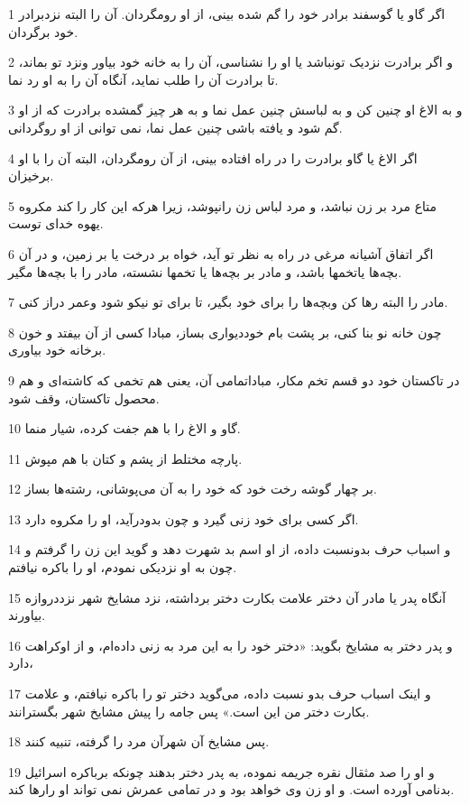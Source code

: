 \par 1 اگر گاو یا گوسفند برادر خود را گم شده بینی، از او رومگردان. آن را البته نزدبرادر خود برگردان.
\par 2 و اگر برادرت نزدیک تونباشد یا او را نشناسی، آن را به خانه خود بیاور ونزد تو بماند، تا برادرت آن را طلب نماید، آنگاه آن را به او رد نما.
\par 3 و به الاغ او چنین کن و به لباسش چنین عمل نما و به هر چیز گمشده برادرت که از او گم شود و یافته باشی چنین عمل نما، نمی توانی از او روگردانی.
\par 4 اگر الاغ یا گاو برادرت را در راه افتاده بینی، از آن رومگردان، البته آن را با او برخیزان.
\par 5 متاع مرد بر زن نباشد، و مرد لباس زن رانپوشد، زیرا هر‌که این کار را کند مکروه یهوه خدای توست.
\par 6 اگر اتفاق آشیانه مرغی در راه به نظر تو آید، خواه بر درخت یا بر زمین، و در آن بچه‌ها یاتخمها باشد، و مادر بر بچه‌ها یا تخمها نشسته، مادر را با بچه‌ها مگیر.
\par 7 مادر را البته رها کن وبچه‌ها را برای خود بگیر، تا برای تو نیکو شود وعمر دراز کنی.
\par 8 چون خانه نو بنا کنی، بر پشت بام خوددیواری بساز، مبادا کسی از آن بیفتد و خون برخانه خود بیاوری.
\par 9 در تاکستان خود دو قسم تخم مکار، مباداتمامی آن، یعنی هم تخمی که کاشته‌ای و هم محصول تاکستان، وقف شود.
\par 10 گاو و الاغ را با هم جفت کرده، شیار منما.
\par 11 پارچه مختلط از پشم و کتان با هم مپوش.
\par 12 بر چهار گوشه رخت خود که خود را به آن می‌پوشانی، رشته‌ها بساز.
\par 13 اگر کسی برای خود زنی گیرد و چون بدودرآید، او را مکروه دارد.
\par 14 و اسباب حرف بدونسبت داده، از او اسم بد شهرت دهد و گوید این زن را گرفتم و چون به او نزدیکی نمودم، او را باکره نیافتم.
\par 15 آنگاه پدر یا مادر آن دختر علامت بکارت دختر برداشته، نزد مشایخ شهر نزددروازه بیاورند.
\par 16 و پدر دختر به مشایخ بگوید: «دختر خود را به این مرد به زنی داده‌ام، و از اوکراهت دارد،
\par 17 و اینک اسباب حرف بدو نسبت داده، می‌گوید دختر تو را باکره نیافتم، و علامت بکارت دختر من این است.» پس جامه را پیش مشایخ شهر بگسترانند.
\par 18 پس مشایخ آن شهرآن مرد را گرفته، تنبیه کنند.
\par 19 و او را صد مثقال نقره جریمه نموده، به پدر دختر بدهند چونکه برباکره اسرائیل بدنامی آورده است. و او زن وی خواهد بود و در تمامی عمرش نمی تواند او رارها کند.
